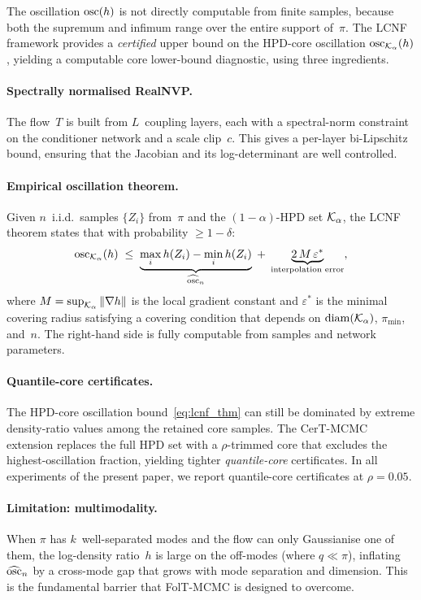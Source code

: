 The oscillation $\mathrm{osc}(h)$ is not directly computable from
finite samples, because both the supremum and infimum range
over the entire support of~$\pi$.  The LCNF framework
\citep{LCNF} provides a \emph{certified} upper bound on the
HPD-core oscillation $\mathrm{osc}_{\mathcal{K}_\alpha}(h)$, yielding a
computable core lower-bound diagnostic, using three ingredients.

\paragraph{Spectrally normalised RealNVP.}
The flow~$T$ is built from $L$~coupling layers, each with a
spectral-norm constraint on the conditioner network and a scale
clip~$c$.  This gives a per-layer bi-Lipschitz bound, ensuring
that the Jacobian and its log-determinant are well controlled.

\paragraph{Empirical oscillation theorem.}
Given $n$~i.i.d.\ samples $\{Z_i\}$ from~$\pi$ and the
$(1{-}\alpha)$-HPD set $\mathcal{K}_\alpha$, the LCNF theorem states
that with probability $\geq 1 - \delta$:
\begin{equation}\label{eq:lcnf_thm}
  \mathrm{osc}_{\mathcal{K}_\alpha}(h)
  \;\leq\;
  \underbrace{\max_i h(Z_i) - \min_i h(Z_i)}_{\widehat{\mathrm{osc}}_n}
  \;+\;
  \underbrace{2\,M\,\varepsilon^*}_{\text{interpolation error}},
\end{equation}
where $M = \sup_{\mathcal{K}_\alpha}\|\nabla h\|$ is the local gradient
constant and $\varepsilon^*$ is the minimal covering radius
satisfying a covering condition that depends on
$\mathrm{diam}(\mathcal{K}_\alpha)$, $\pi_{\min}$, and~$n$.
The right-hand side is fully computable from samples and
network parameters.

\paragraph{Quantile-core certificates.}
The HPD-core oscillation bound~\eqref{eq:lcnf_thm}
can still be dominated by extreme density-ratio values
among the retained core samples.  The CerT-MCMC extension
\citep{CerTMCMC} replaces the full HPD set with a
$\rho$-trimmed core that excludes the highest-oscillation
fraction, yielding tighter \emph{quantile-core} certificates.
In all experiments of the present paper, we report
quantile-core certificates at $\rho = 0.05$.

\paragraph{Limitation: multimodality.}
When $\pi$ has $k$~well-separated modes and the flow can
only Gaussianise one of them, the log-density ratio~$h$
is large on the off-modes (where $q \ll \pi$), inflating
$\widehat{\mathrm{osc}}_n$ by a cross-mode gap that grows with
mode separation and dimension.
This is the fundamental barrier that FolT-MCMC is designed
to overcome.



